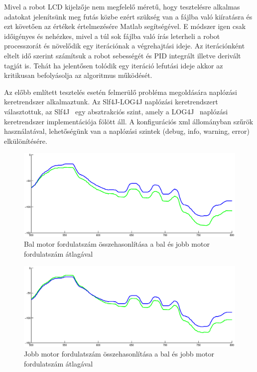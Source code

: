 Mivel a robot LCD kijelzője nem megfelelő méretű, hogy tesztelésre alkalmas adatokat jelenítsünk meg futás közbe ezért szükség van a fájlba való kiíratásra és ezt követően az értékek értelmezésére Matlab segítségével. E módszer igen csak időigényes és nehézkes, mivel a túl sok fájlba való írás leterheli a robot processzorát és növelődik egy iterációnak a végrehajtási ideje. Az iterációnként eltelt idő szerint számítsuk a robot sebességét és PID integrált illetve derivált tagját is. Tehát ha jelentősen tolódik egy iteráció lefutási ideje akkor az kritikusan befolyásolja az algoritmus működését.

Az előbb említett tesztelés esetén felmerülő probléma megoldására naplózási keretrendszer alkalmaztunk. Az Slf4J-LOG4J naplózási keretrendszert választottuk, az Slf4J~\cite{slf4j} egy absztrakciós szint, amely a LOG4J~\cite{log4j} naplózási keretrendszer implementációja fölött áll. A konfigurációs xml állományban szűrök használatával, lehetőségünk van a naplózási szintek  (debug, info, warning, error) elkülönítésére.

\begin{figure}[!htb]
	\begin{center}
		\includegraphics[width=1.0\linewidth]{images/balTacho.eps}
	\end{center}
	\caption{Bal motor fordulatszám összehasonlítása a bal és jobb motor fordulatszám átlagával}
	\label{balTachoFig}
\end{figure}

\begin{figure}[!htb]
	\begin{center}
		\includegraphics[width=1.0\linewidth]{images/jobbTacho.eps}
	\end{center}
	\caption{Jobb motor fordulatszám összehasonlítása a bal és jobb motor fordulatszám átlagával}
	\label{jobbTachoFig}
\end{figure}

